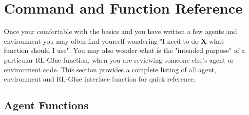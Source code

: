 \documentclass[11pt]{article}
\begin{document}
\section{Command and Function Reference}
\label{ref}
Once your comfortable with the basics and you have written a few agents and environment you may often find yourself wondering "I need to do {\bf X} what function should I use". You may also wonder what is the "intended purpose" of a particular RL-Glue function, when you are reviewing someone else's agent or environment code. This section provides a complete listing of all agent, environment and RL-Glue interface function for quick reference.
\subsection{Agent Functions}
 
\end{document}
